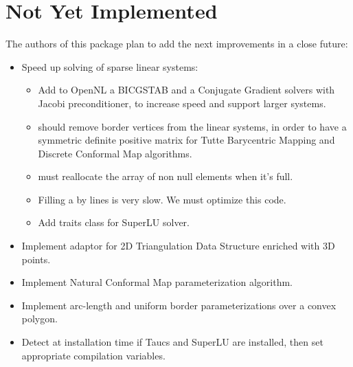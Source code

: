 \section{Not Yet Implemented}

The authors of this package plan to add the next improvements in a close
future:

\begin{itemize}

\item Speed up solving of sparse linear systems:

    \begin{itemize}

    \item Add to OpenNL a BICGSTAB and a Conjugate Gradient solvers
    with Jacobi preconditioner, to increase speed and support larger systems.

    \item {} 
    should remove border vertices from
    the linear systems, in order to have a symmetric definite positive matrix
    for Tutte Barycentric Mapping and Discrete Conformal Map algorithms.

    \item {} must reallocate the array of non null elements when it's full.

    \item Filling a  by lines is very slow. We must optimize this code.

    \item Add traits class for SuperLU solver.

    \end{itemize}

\item Implement  adaptor for 2D Triangulation
Data Structure enriched with 3D points.

\item Implement Natural Conformal Map parameterization algorithm.

\item Implement arc-length and uniform border parameterizations
      over a convex polygon.

\item Detect at installation time if {\sc Taucs} and SuperLU are installed,
      then set appropriate compilation variables.


\end{itemize}
